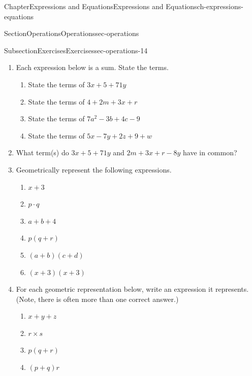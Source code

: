 \documentclass[twoside,11pt,]{book}
\numberwithin{equation}{chapter}
\begin{document}
\begin{chapterptx}{Chapter}{Expressions and Equations}{}{Expressions and Equations}{}{}{ch-expressions-equations}
\begin{sectionptx}{Section}{Operations}{}{Operations}{}{}{sec-operations}
\begin{subsectionptx}{Subsection}{Exercises}{}{Exercises}{}{}{sec-operations-14}
\begin{enumerate}
\begin{enumerate}
\item{}\((t^4 - 3) \cdot (8) + (10)(x-5)\) and \(t^4-3 \cdot (8) + 10(x-5)\)%
\item{}\(9 \cdot (x-2)+4\) and \(9 \cdot x-2+4\)%
\item{}\(a - b \div c + (x - y)^z\) and \(a - b \div c + x - y^z\)%
\item{}\(x \div y - z + a^b\) and \(x \div (y - z) + a^b\)%
\item{}\(a \cdot b + c \div d - e \cdot f + g \cdot h\) and \(a \cdot b + c \div d - (e \cdot f + g \cdot h)\)%
\item{}\(p \div q + r \cdot s\) and \((p \div q + r) \cdot s\)%
\end{enumerate}
%
\item{}Each expression below is a sum. State the terms.%
\begin{enumerate}
\item{}State the terms of \(3x + 5 + 71y\)%
\item{}State the terms of \(4 + 2m + 3x + r\)%
\item{}State the terms of \(7a^2 - 3b + 4c - 9\)%
\item{}State the terms of \(5x - 7y + 2z + 9 + w\)%
\end{enumerate}
%
\item{}What term(s) do \(3x + 5 + 71y\) and \(2m + 3x + r - 8y\) have in common?%
\item{}Geometrically represent the following expressions.%
\begin{enumerate}
\item{}\(\displaystyle x+3\)%
\item{}\(\displaystyle p \cdot q\)%
\item{}\(\displaystyle a+b+4\)%
\item{}\(\displaystyle p(q+r)\)%
\item{}\(\displaystyle (a+b)(c+d)\)%
\item{}\(\displaystyle (x+3)(x+3)\)%
\end{enumerate}
%
\item{}For each geometric representation below, write an expression it represents. (Note, there is often more than one correct answer.)%
\begin{enumerate}
\item{}\(\displaystyle x + y + z\)%
\item{}\(\displaystyle r \times s\)%
\item{}\(\displaystyle p(q + r)\)%
\item{}\(\displaystyle (p+q)r\)%

\end{enumerate}
\end{enumerate}
\end{subsectionptx}
\end{sectionptx}
\end{chapterptx}
\end{document}
